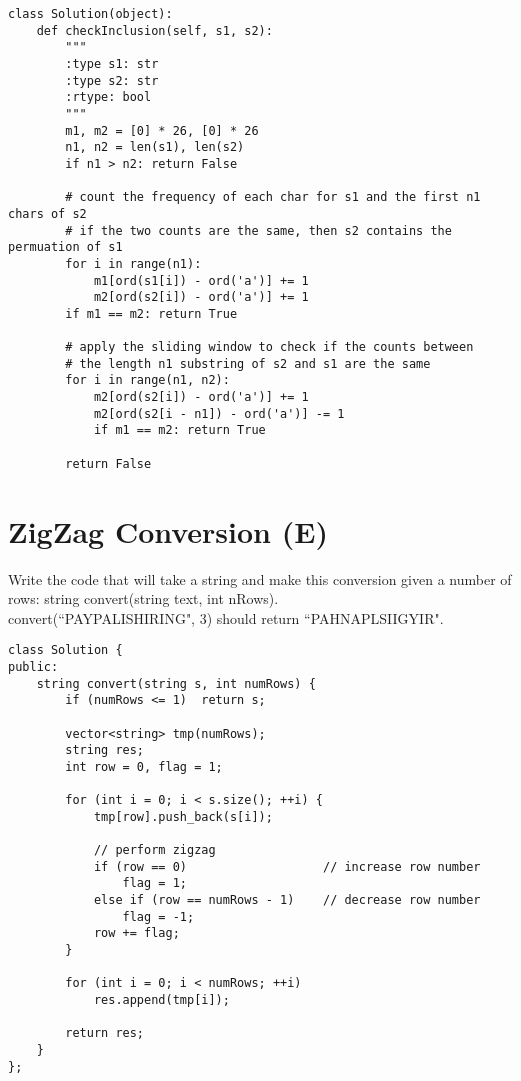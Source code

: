 \begin{lstlisting}
class Solution(object):
    def checkInclusion(self, s1, s2):
        """
        :type s1: str
        :type s2: str
        :rtype: bool
        """
        m1, m2 = [0] * 26, [0] * 26
        n1, n2 = len(s1), len(s2)
        if n1 > n2: return False
        
        # count the frequency of each char for s1 and the first n1 chars of s2 
        # if the two counts are the same, then s2 contains the permuation of s1
        for i in range(n1):
            m1[ord(s1[i]) - ord('a')] += 1
            m2[ord(s2[i]) - ord('a')] += 1
        if m1 == m2: return True
        
        # apply the sliding window to check if the counts between
        # the length n1 substring of s2 and s1 are the same
        for i in range(n1, n2):
            m2[ord(s2[i]) - ord('a')] += 1
            m2[ord(s2[i - n1]) - ord('a')] -= 1
            if m1 == m2: return True
            
        return False
\end{lstlisting}

\section{ZigZag Conversion (E)}
Write the code that will take a string and make this conversion given a number of rows: string convert(string text, int nRows). \\
convert(``PAYPALISHIRING", 3) should return ``PAHNAPLSIIGYIR". \\

\begin{lstlisting}
class Solution {
public:
    string convert(string s, int numRows) {
        if (numRows <= 1)  return s;
        
        vector<string> tmp(numRows);
        string res;
        int row = 0, flag = 1;
        
        for (int i = 0; i < s.size(); ++i) {
            tmp[row].push_back(s[i]);
            
            // perform zigzag
            if (row == 0)                   // increase row number
                flag = 1;
            else if (row == numRows - 1)    // decrease row number
                flag = -1;
            row += flag;
        }
        
        for (int i = 0; i < numRows; ++i)
            res.append(tmp[i]);
            
        return res;
    }
};
\end{lstlisting}


